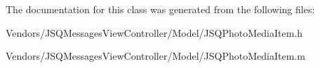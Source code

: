 The documentation for this class was generated from the following files\+:\begin{DoxyCompactItemize}
\item 
Vendors/\+J\+S\+Q\+Messages\+View\+Controller/\+Model/J\+S\+Q\+Photo\+Media\+Item.\+h\item 
Vendors/\+J\+S\+Q\+Messages\+View\+Controller/\+Model/J\+S\+Q\+Photo\+Media\+Item.\+m\end{DoxyCompactItemize}
